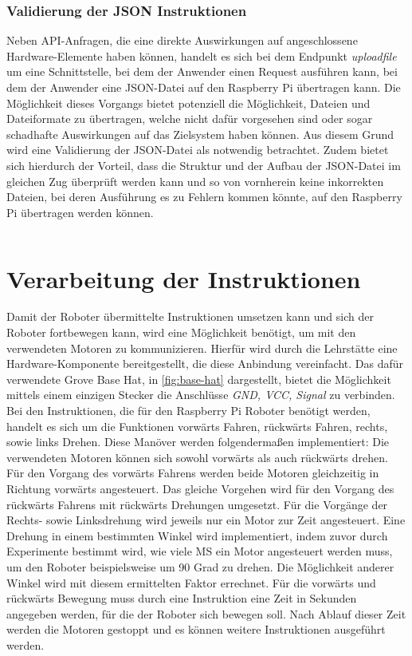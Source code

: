 \subsubsection*{Validierung der JSON Instruktionen}
Neben API-Anfragen, die eine direkte Auswirkungen auf angeschlossene Hardware-Elemente haben können, handelt es sich bei dem Endpunkt \textit{uploadfile} um eine Schnittstelle, bei dem der Anwender einen Request ausführen kann, bei dem der Anwender eine JSON-Datei auf den Raspberry Pi übertragen kann. Die Möglichkeit dieses Vorgangs bietet potenziell die Möglichkeit, Dateien und Dateiformate zu übertragen, welche nicht dafür vorgesehen sind oder sogar schadhafte Auswirkungen auf das Zielsystem haben können. Aus diesem Grund wird eine Validierung der JSON-Datei als notwendig betrachtet. Zudem bietet sich hierdurch der Vorteil, dass die Struktur und der Aufbau der JSON-Datei im gleichen Zug überprüft werden kann und so von vornherein keine inkorrekten Dateien, bei deren Ausführung es zu Fehlern kommen könnte, auf den Raspberry Pi übertragen werden können.

\inputminted{python}{{assets/code/json-check.py}}
\vspace*{-3mm}
\vspace*{3mm}

\section{Verarbeitung der Instruktionen}
Damit der Roboter übermittelte Instruktionen umsetzen kann und sich der Roboter fortbewegen kann, wird eine Möglichkeit benötigt, um mit den verwendeten Motoren zu kommunizieren. Hierfür wird durch die Lehrstätte eine Hardware-Komponente bereitgestellt, die diese Anbindung vereinfacht. Das dafür verwendete Grove Base Hat, in \autoref{fig:base-hat} dargestellt, bietet die Möglichkeit mittels einem einzigen Stecker die Anschlüsse \textit{GND, VCC, Signal} zu verbinden. Bei den Instruktionen, die für den Raspberry Pi Roboter benötigt werden, handelt es sich um die Funktionen vorwärts Fahren, rückwärts Fahren, rechts, sowie links Drehen. Diese Manöver werden folgendermaßen implementiert: Die verwendeten Motoren können sich sowohl vorwärts als auch rückwärts drehen. Für den Vorgang des vorwärts Fahrens werden beide Motoren gleichzeitig in Richtung vorwärts angesteuert. Das gleiche Vorgehen wird für den Vorgang des rückwärts Fahrens mit rückwärts Drehungen umgesetzt. Für die Vorgänge der Rechts- sowie Linksdrehung wird jeweils nur ein Motor zur Zeit angesteuert. Eine Drehung in einem bestimmten Winkel wird implementiert, indem zuvor durch Experimente bestimmt wird, wie viele MS ein Motor angesteuert werden muss, um den Roboter beispielsweise um 90 Grad zu drehen. Die Möglichkeit anderer Winkel wird mit diesem ermittelten Faktor errechnet. Für die vorwärts und rückwärts Bewegung muss durch eine Instruktion eine Zeit in Sekunden angegeben werden, für die der Roboter sich bewegen soll. Nach Ablauf dieser Zeit werden die Motoren gestoppt und es können weitere Instruktionen ausgeführt werden.

